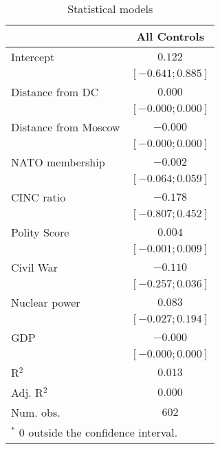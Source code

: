 
\begin{table}
\begin{center}
\begin{tabular}{l c}
\hline
 & All Controls \\
\hline
Intercept            & $0.122$            \\
                     & $ [-0.641; 0.885]$ \\
Distance from DC     & $0.000$            \\
                     & $ [-0.000; 0.000]$ \\
Distance from Moscow & $-0.000$           \\
                     & $ [-0.000; 0.000]$ \\
NATO membership      & $-0.002$           \\
                     & $ [-0.064; 0.059]$ \\
CINC ratio           & $-0.178$           \\
                     & $ [-0.807; 0.452]$ \\
Polity Score         & $0.004$            \\
                     & $ [-0.001; 0.009]$ \\
Civil War            & $-0.110$           \\
                     & $ [-0.257; 0.036]$ \\
Nuclear power        & $0.083$            \\
                     & $ [-0.027; 0.194]$ \\
GDP                  & $-0.000$           \\
                     & $ [-0.000; 0.000]$ \\
\hline
R$^2$                & $0.013$            \\
Adj. R$^2$           & $0.000$            \\
Num. obs.            & $602$              \\
\hline
\multicolumn{2}{l}{\scriptsize{$^*$ 0 outside the confidence interval.}}
\end{tabular}
\caption{Statistical models}
\label{table:coefficients}
\end{center}
\end{table}
